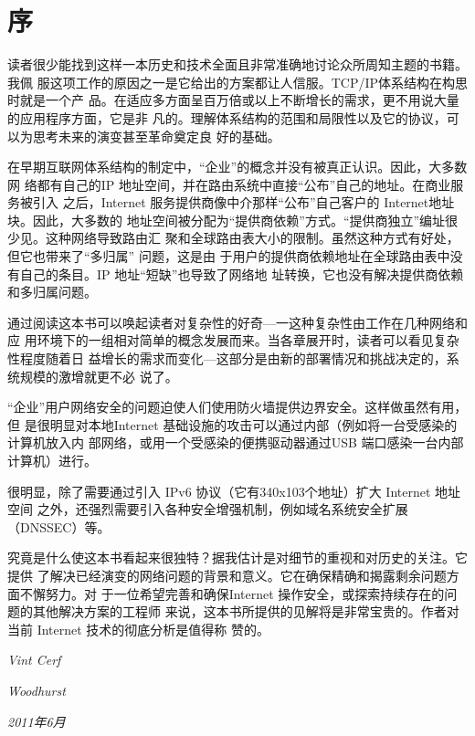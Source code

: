 \chapter*{序}

读者很少能找到这样一本历史和技术全面且非常准确地讨论众所周知主题的书籍。我佩
服这项工作的原因之一是它给出的方案都让人信服。TCP/IP体系结构在构思时就是一个产
品。在适应多方面呈百万倍或以上不断增长的需求，更不用说大量的应用程序方面，它是非
凡的。理解体系结构的范围和局限性以及它的协议，可以为思考未来的演变甚至革命奠定良
好的基础。

在早期互联网体系结构的制定中，“企业”的概念并没有被真正认识。因此，大多数网
络都有自己的IP 地址空间，并在路由系统中直接“公布”自己的地址。在商业服务被引入
之后，Internet 服务提供商像中介那样“公布”自己客户的 Internet地址块。因此，大多数的
地址空间被分配为“提供商依赖”方式。“提供商独立”编址很少见。这种网络导致路由汇
聚和全球路由表大小的限制。虽然这种方式有好处，但它也带来了“多归属” 问题，这是由
于用户的提供商依赖地址在全球路由表中没有自己的条目。IP 地址“短缺”也导致了网络地
址转换，它也没有解决提供商依赖和多归属问题。

通过阅读这本书可以唤起读者对复杂性的好奇—一这种复杂性由工作在几种网络和应
用环境下的一组相对简单的概念发展而来。当各章展开时，读者可以看见复杂性程度随着日
益增长的需求而变化—这部分是由新的部署情况和挑战决定的，系统规模的激增就更不必
说了。

“企业”用户网络安全的问题迫使人们使用防火墙提供边界安全。这样做虽然有用，但
是很明显对本地Internet 基础设施的攻击可以通过内部（例如将一台受感染的计算机放入内
部网络，或用一个受感染的便携驱动器通过USB 端口感染一台内部计算机）进行。

很明显，除了需要通过引入 IPv6 协议（它有340x103个地址）扩大 Internet 地址空间
之外，还强烈需要引入各种安全增强机制，例如域名系统安全扩展（DNSSEC）等。

究竟是什么使这本书看起来很独特？据我估计是对细节的重视和对历史的关注。它提供
了解决已经演变的网络问题的背景和意义。它在确保精确和揭露剩余问题方面不懈努力。对
于一位希望完善和确保Internet 操作安全，或探索持续存在的问题的其他解决方案的工程师
来说，这本书所提供的见解将是非常宝贵的。作者对当前 Internet 技术的彻底分析是值得称
赞的。

\begin{flushright}
  \emph{Vint Cerf}
\end{flushright}

\begin{flushright}
  \emph{Woodhurst}
\end{flushright}

\begin{flushright}
  \emph{2011年6月}
\end{flushright}
